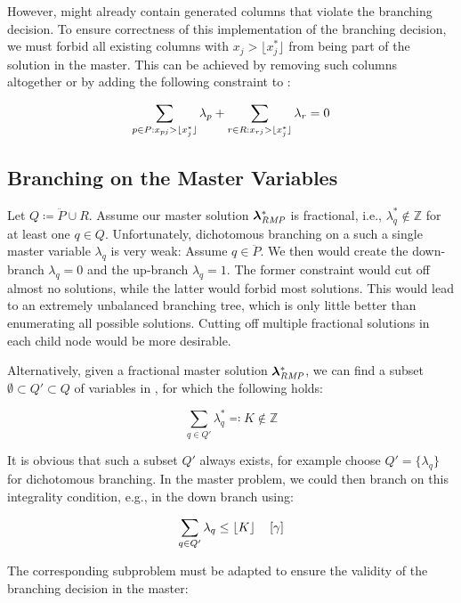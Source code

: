 However, \RMP{} might already contain generated columns that violate the branching decision. To ensure correctness of this implementation of the branching decision, we must forbid all existing columns with $x_j > \lfloor x_j^* \rfloor$ from being part of the solution in the master. This can be achieved by removing such columns altogether or by adding the following constraint to \MP{}:

\begin{equation}
\sum_{p \in P: x_{pj} > \lfloor x_j^*\rfloor} \lambda_p + \sum_{r \in R: x_{rj} > \lfloor x_j^*\rfloor} \lambda_r = 0
\end{equation}

\subsection{Branching on the Master Variables}\label{sec:cg_bp_bp_branching_master}
Let $Q \coloneqq \ddot{P} \cup R$. Assume our master solution ${\bm{\lambda}}^*_{\textit{RMP}}{}$ is fractional, i.e., $\lambda_q^* \not\in \mathbb{Z}$ for at least one $q \in Q$. Unfortunately, dichotomous branching on a such a single master variable $\lambda_q$ is very weak: Assume $q \in \ddot{P}$. We then would create the down-branch $\lambda_q = 0$ and the up-branch $\lambda_q = 1$. The former constraint would cut off almost no solutions, while the latter would forbid most solutions. This would lead to an extremely unbalanced branching tree, which is only little better than enumerating all possible solutions. Cutting off multiple fractional solutions in each child node would be more desirable.

Alternatively, given a fractional master solution ${\bm{\lambda}}^*_{\textit{RMP}}{}$, we can find a subset $\emptyset \subset Q' \subset Q$ of variables in \RMP{}, for which the following holds:

\begin{equation}
\sum_{q \in Q'} \lambda_q^* \eqqcolon K \not\in \mathbb{Z}
\end{equation}

It is obvious that such a subset $Q'$ always exists, for example choose $Q' = \{\lambda_q\}$ for dichotomous branching. In the master problem, we could then branch on this integrality condition, e.g., in the down branch using:

\begin{equation}
\sum_{q \in Q'} \lambda_q \leq \lfloor K\rfloor \quad \left[\gamma\right]
\end{equation}

The corresponding subproblem must be adapted to ensure the validity of the branching decision in the master:

